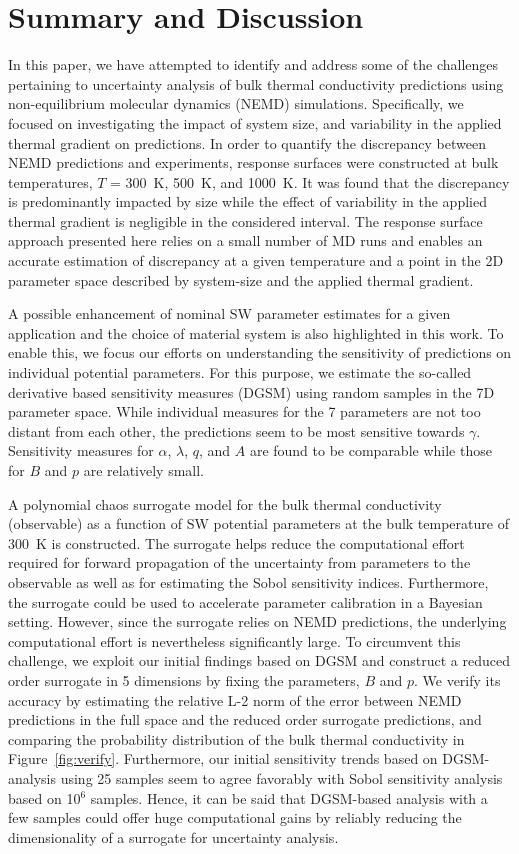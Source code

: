 \section{Summary and Discussion}
\label{sec:disc}

In this paper, we have attempted to identify and address some of the challenges
pertaining to uncertainty analysis of bulk thermal conductivity predictions 
using non-equilibrium molecular dynamics (NEMD) simulations. Specifically, we focused
on investigating the impact of system size, and variability in the applied thermal
gradient on predictions. In order to quantify the discrepancy between NEMD
predictions and experiments, response surfaces were  
constructed at bulk temperatures, $T$ = 300~K, 500~K, and 1000~K.  
It was found that the discrepancy is predominantly impacted by size while the 
effect of variability in the applied thermal gradient is negligible in the considered
interval. The response surface approach presented here relies on a small number of
MD runs and enables an accurate estimation of discrepancy at a given temperature
and a point in the 2D parameter space described by system-size and the applied
thermal gradient. 

A possible enhancement of nominal SW parameter estimates for a given application
and the choice of material system is also highlighted in this work. To enable this,
we focus our efforts on understanding the sensitivity of predictions on individual potential
parameters. For this purpose, we estimate the so-called derivative based sensitivity
measures (DGSM) using random samples in the 7D parameter space. While individual
measures for the 7 parameters are not too distant from each other, the predictions
seem to be most sensitive towards $\gamma$. Sensitivity measures for $\alpha$,
$\lambda$, $q$, and $A$ are found to be comparable while those for $B$ and $p$
are relatively small. 

A polynomial chaos surrogate model for the bulk thermal conductivity (observable)
as a function of SW potential
parameters at the bulk temperature of 300~K is constructed. The surrogate helps reduce the
computational effort required for forward propagation of the uncertainty from
parameters to the observable as well as for estimating the Sobol sensitivity indices.
Furthermore, the surrogate could be used to accelerate parameter calibration in a
Bayesian setting. However, since the surrogate relies on NEMD predictions, the
underlying computational effort is nevertheless significantly large. To circumvent
this challenge, we exploit our initial findings based on DGSM and construct
a reduced order surrogate in 5 dimensions by fixing the parameters, $B$ and $p$.
We verify its accuracy by estimating the relative
L-2 norm of the error between NEMD predictions in the full space and the reduced
order surrogate predictions, and comparing the probability distribution of the
bulk thermal conductivity in Figure~\ref{fig:verify}. Furthermore, our initial
sensitivity trends based on DGSM-analysis using 25 samples seem to agree favorably
with Sobol sensitivity analysis based on 10$^{6}$ samples. Hence, it can be said
that DGSM-based analysis with a few samples could offer huge computational gains
by reliably reducing the dimensionality of a surrogate for uncertainty analysis. 

